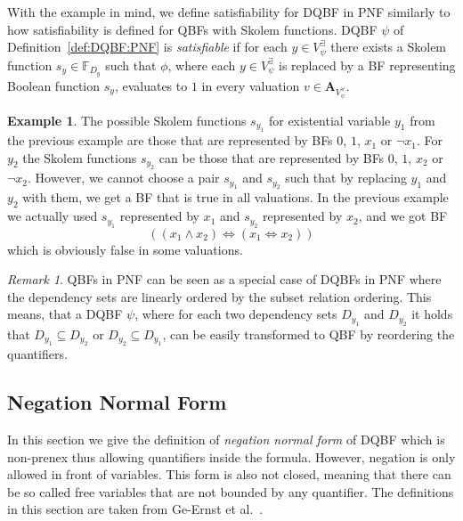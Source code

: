 \documentclass[
  digital, %
  color,
  twoside, %
  table,   %
  nolof,     %
  nolot,     %
]{fithesis3}
\theoremstyle{definition}
\newtheorem{example}{Example}
\theoremstyle{remark}
\newtheorem*{remark}{Remark}
\newcommand{\valtns}[1]{\mathbf{A}_{#1}}
\newcommand{\BFuncs}[1]{\mathbb{F}_{#1}}
\newcommand{\evars}[1]{V_{#1}^{\exists}}
\newcommand{\uvars}[1]{V_{#1}^{\forall}}
\newcommand{\lequal}{\Leftrightarrow}
\begin{document}
With the example in mind, we define satisfiability for DQBF in PNF similarly to how satisfiability is defined for QBFs with Skolem functions. DQBF $\psi$ of Definition~\ref{def:DQBF:PNF} is \emph{satisfiable} if for each $y \in \evars{\psi}$ there exists a Skolem function $s_y \in \BFuncs{D_y}$ such that $\phi$, where each $y \in \evars{\psi}$ is replaced by a BF representing Boolean function $s_y$, evaluates to $1$ in every valuation $v \in \valtns{\uvars{\psi}}$.

\begin{example}
The possible Skolem functions $s_{y_1}$ for existential variable $y_1$ from the previous example are those that are represented by BFs $0$, $1$, $x_1$ or $\neg x_1$. For $y_2$ the Skolem functions $s_{y_2}$ can be those that are represented by BFs $0$, $1$, $x_2$ or $\neg x_2$. However, we cannot choose a pair $s_{y_1}$ and $s_{y_2}$ such that by replacing $y_1$ and $y_2$ with them, we get a BF that is true in all valuations. In the previous example we actually used $s_{y_1}$ represented by $x_1$ and $s_{y_2}$ represented by $x_2$, and we got BF
\[((x_1 \land x_2) \lequal (x_1 \lequal x_2))\]
which is obviously false in some valuations.
\end{example}

\begin{remark}
QBFs in PNF can be seen as a special case of DQBFs in PNF where the dependency sets are linearly ordered by the subset relation ordering. This means, that a DQBF $\psi$, where for each two dependency sets $D_{y_1}$ and $D_{y_2}$ it holds that $D_{y_1} \subseteq D_{y_2}$ or $D_{y_2} \subseteq D_{y_1}$, can be easily transformed to QBF by reordering the quantifiers.
\end{remark}

\subsection{Negation Normal Form}
In this section we give the definition of \emph{negation normal form} of DQBF which is non-prenex thus allowing quantifiers inside the formula. However, negation is only allowed in front of variables. %
This form is also not closed, meaning that there can be so called free variables that are not bounded by any quantifier. The definitions in this section are taken from Ge-Ernst et al.~\cite{HQSquantifierLocalisation}.
\end{document}
